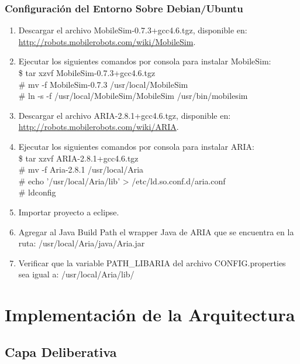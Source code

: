 \documentclass[11pt,twoside,A5]{article}
\newcommand{\sourcecode}[2][\footnotesize]{{\ttfamily#1#2}}
\newcommand{\link}[1]{{\footnotesize\url{#1}}}
\begin{document}
\subsubsection*{Configuración del Entorno Sobre Debian/Ubuntu}

\begin{enumerate}
\item Descargar el archivo \sourcecode{MobileSim-0.7.3+gcc4.6.tgz}, disponible en: \\ \link{http://robots.mobilerobots.com/wiki/MobileSim}.
\item Ejecutar los siguientes comandos por consola para instalar MobileSim:
\sourcecode{ 
\\ \$ tar xzvf MobileSim-0.7.3+gcc4.6.tgz
\\ \# mv -f MobileSim-0.7.3 /usr/local/MobileSim
\\ \# ln -s -f /usr/local/MobileSim/MobileSim /usr/bin/mobilesim}
\item Descargar el archivo \sourcecode{ARIA-2.8.1+gcc4.6.tgz}, disponible en: \\ \link{http://robots.mobilerobots.com/wiki/ARIA}.
\item Ejecutar los siguientes comandos por consola para instalar ARIA:
\sourcecode{
\\ \$ tar xzvf ARIA-2.8.1+gcc4.6.tgz
\\ \# mv -f Aria-2.8.1 /usr/local/Aria
\\ \# echo '/usr/local/Aria/lib' > /etc/ld.so.conf.d/aria.conf
\\ \# ldconfig}
\item Importar proyecto a eclipse.
\item Agregar al \sourcecode{Java Build Path} el wrapper Java de ARIA que se encuentra en la ruta: \sourcecode{/usr/local/Aria/java/Aria.jar}
\item Verificar que la variable \sourcecode{PATH\_LIBARIA} del archivo \sourcecode{CONFIG.properties} 
	  sea igual a: \sourcecode{/usr/local/Aria/lib/}
\end{enumerate}

\section*{Implementación de la Arquitectura}

\subsection*{Capa Deliberativa}
\end{document}
